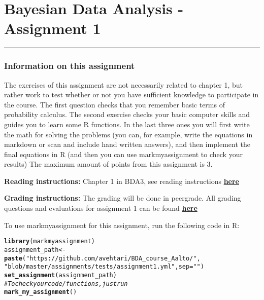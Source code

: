 \documentclass[11pt,a4paper,english]{article}\usepackage[]{graphicx}\usepackage[]{xcolor}
\makeatletter
\newcommand{\hlstr}[1]{\textcolor[rgb]{0.192,0.494,0.8}{#1}}%
\newcommand{\hlcom}[1]{\textcolor[rgb]{0.678,0.584,0.686}{\textit{#1}}}%
\newcommand{\hlstd}[1]{\textcolor[rgb]{0.345,0.345,0.345}{#1}}%
\newcommand{\hlkwb}[1]{\textcolor[rgb]{0.69,0.353,0.396}{#1}}%
\newcommand{\hlkwc}[1]{\textcolor[rgb]{0.333,0.667,0.333}{#1}}%
\newcommand{\hlkwd}[1]{\textcolor[rgb]{0.737,0.353,0.396}{\textbf{#1}}}%
\newenvironment{kframe}{%
 \def\at@end@of@kframe{}%
 \ifinner\ifhmode%
  \def\at@end@of@kframe{\end{minipage}}%
  \begin{minipage}{\columnwidth}%
 \fi\fi%
 \def\FrameCommand##1{\hskip\@totalleftmargin \hskip-\fboxsep
 \colorbox{shadecolor}{##1}\hskip-\fboxsep
     \hskip-\linewidth \hskip-\@totalleftmargin \hskip\columnwidth}%
 \MakeFramed {\advance\hsize-\width
   \@totalleftmargin\z@ \linewidth\hsize
   \@setminipage}}%
 {\par\unskip\endMakeFramed%
 \at@end@of@kframe}
\newenvironment{knitrout}{}{} %
\newcommand{\HRule}{\rule{\linewidth}{0.5mm}}
\makeatother
\begin{document}

\section*{Bayesian Data Analysis - Assignment 1}

\HRule





\newpage

\subsubsection*{Information on this assignment}

The exercises of this assignment are not necessarily related to chapter 1, but rather work to test whether or not you have sufficient knowledge to participate in the course. The first question checks that you remember basic terms of probability calculus. The second exercise checks your basic computer skills and guides you to learn some R functions. In the last three ones you will first write the math for solving the problems (you can, for example, write the equations in markdown or scan and include hand written answers), and then implement the final equations in R (and then you can use markmyassignment to check your results) The maximum amount of points from this assignment is 3.

\textbf{Reading instructions:} Chapter 1 in BDA3, see reading instructions \href{https://avehtari.github.io/BDA_course_Aalto/chapter_notes/BDA_notes_ch1.pdf}{\textbf{here}}

\textbf{Grading instructions:} The grading will be done in peergrade. All grading questions and evaluations for assignment 1 can be found \href{https://avehtari.github.io/BDA_course_Aalto/assignments/assignment1_rubric.md}{\textbf{here}}

To use markmyassignment for this assignment, run the following code in R:

\begin{knitrout}\small
{}\color{fgcolor}\begin{kframe}
\begin{alltt}
\hlkwd{library}\hlstd{(markmyassignment)}
\hlstd{assignment_path} \hlkwb{<-}
  \hlkwd{paste}\hlstd{(}\hlstr{"https://github.com/avehtari/BDA_course_Aalto/"}\hlstd{,}
        \hlstr{"blob/master/assignments/tests/assignment1.yml"}\hlstd{,} \hlkwc{sep}\hlstd{=}\hlstr{""}\hlstd{)}
\hlkwd{set_assignment}\hlstd{(assignment_path)}
\hlcom{# To check your code/functions, just run}
\hlkwd{mark_my_assignment}\hlstd{()}
\end{alltt}
\end{kframe}
\end{knitrout}
\end{document}
